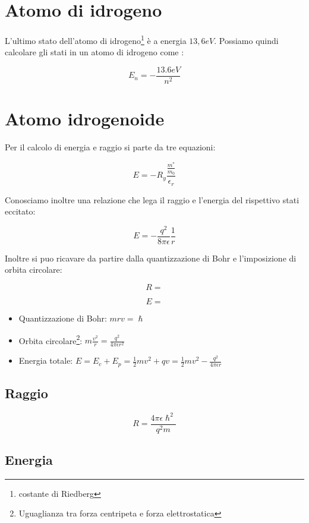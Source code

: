 \documentclass[10pt,a4paper]{report}
\begin{document}
	\section{Atomo di idrogeno}

	L'ultimo stato dell'atomo di idrogeno\footnote{costante di Riedberg} è a energia $13,6eV$.
	Possiamo quindi calcolare gli stati in un atomo di idrogeno come :

	\[
	E_n=-\frac{13.6eV}{n^2}
	\] 

	\section{Atomo idrogenoide}
	Per il calcolo di energia e raggio si parte da tre equazioni:

	\[
	E=-R_y\frac{\frac{m^*}{m_0}}{\epsilon_r}
	\]

	Conosciamo inoltre una relazione che lega il raggio e l'energia del rispettivo stati eccitato:

	\[
	E=-\frac{q^2}{8\pi \epsilon}\frac{1}{r}
	\]

	Inoltre si puo ricavare da partire dalla quantizzazione di Bohr e l'imposizione di orbita circolare:



	\[
	R=
	\]

	\[
	E=
	\]












	\begin{itemize}
	\item Quantizzazione di Bohr:   $mrv=\hslash$
	\item Orbita circolare\footnote{Uguaglianza tra forza centripeta e forza elettrostatica}:	$ m \frac {v^2} {r} = \frac{q^2}{4\pi \epsilon r^2}$
	\item Energia totale:	$E=E_c+E_p=\frac{1}{2}mv^2+qv=\frac{1}{2}mv^2-\frac{q^2}{4\pi \epsilon r}$
	\end{itemize}
		
		\subsection{Raggio}

		\[
		R=\frac{4\pi \epsilon \hslash^2}{q^2 m}	
		\]

		\subsection{Energia}
\end{document}
